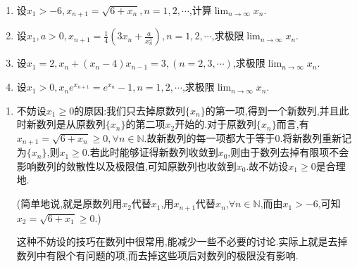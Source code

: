 \documentclass[../../main.tex]{subfiles}%
\begin{document}
\begin{example}[$\,\,$递增/递减递推数列]
\begin{enumerate}
\item 设\(x_1 > - 6,x_{n + 1} = \sqrt{6 + x_n},n = 1,2,\cdots\),计算\(\lim_{n \to \infty} x_n\).
\item 设\(x_1,a > 0,x_{n + 1} = \frac{1}{4}(3x_n+\frac{a}{x_n^3}),n = 1,2,\cdots\),求极限\(\lim_{n \to \infty} x_n\).
\item 设\(x_1 = 2,x_n+(x_n - 4)x_{n - 1} = 3,(n = 2,3,\cdots)\),求极限\(\lim_{n \to \infty} x_n\).
\item 设\(x_1 > 0,x_n e^{x_{n + 1}} = e^{x_n}-1,n = 1,2,\cdots\),求极限\(\lim_{n \to \infty} x_n\).
\end{enumerate}
\end{example}
\begin{note}
\begin{enumerate}
\item 不妨设$x_1\geqslant  0$的原因:我们只去掉原数列$\{x_n\}$的第一项,得到一个新数列,并且此时新数列是从原数列$\{x_n\}$的第二项$x_2$开始的.对于原数列$\{x_n\}$而言,有$x_{n+1}=\sqrt{6+x_n}\geqslant  0,\forall n \in \mathbb{N}$.故新数列的每一项都大于等于0.将新数列重新记为$\{x_n\}$,则$x_1\geqslant  0$.若此时能够证得新数列收敛到$x_0$,则由于数列去掉有限项不会影响数列的敛散性以及极限值,可知原数列也收敛到$x_0$.故不妨设$x_1\geqslant  0$是合理地.

(简单地说,就是原数列用$x_2$代替$x_1$,用$x_{n+1}$代替$x_n$,$\forall n \in \mathbb{N}$,而由$x_1>-6$,可知$x_2=\sqrt{6+x_1}\geqslant  0$.)

\begin{remark}
{\color{blue}这种不妨设的技巧在数列中很常用,能减少一些不必要的讨论.实际上就是去掉数列中有限个有问题的项,而去掉这些项后对数列的极限没有影响.}
\end{remark}
\end{enumerate}
\end{note}
\end{document}
